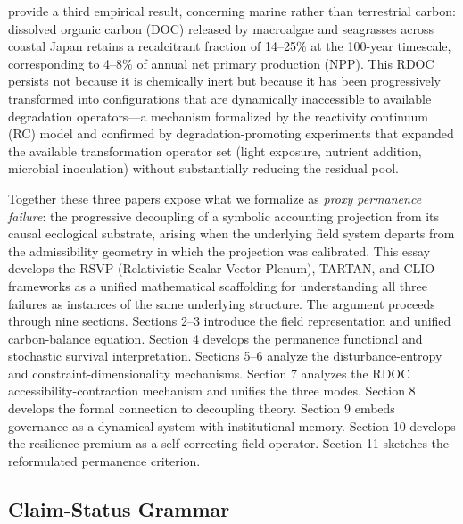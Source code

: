 \documentclass[12pt]{article}
\begin{document}
\citet{Watanabe2026} provide a third empirical result, concerning marine rather than
terrestrial carbon: dissolved organic carbon (DOC) released by macroalgae and seagrasses
across coastal Japan retains a recalcitrant fraction of 14--25\% at the 100-year timescale,
corresponding to 4--8\% of annual net primary production (NPP). This RDOC persists not
because it is chemically inert but because it has been progressively transformed into
configurations that are dynamically inaccessible to available degradation operators---a
mechanism formalized by the reactivity continuum (RC) model and confirmed by
degradation-promoting experiments that expanded the available transformation operator set
(light exposure, nutrient addition, microbial inoculation) without substantially reducing
the residual pool.

Together these three papers expose what we formalize as \emph{proxy permanence failure}:
the progressive decoupling of a symbolic accounting projection from its causal ecological
substrate, arising when the underlying field system departs from the admissibility geometry
in which the projection was calibrated. This essay develops the RSVP (Relativistic
Scalar-Vector Plenum), TARTAN, and CLIO frameworks as a unified mathematical scaffolding
for understanding all three failures as instances of the same underlying structure. The
argument proceeds through nine sections. Sections 2--3 introduce the field representation
and unified carbon-balance equation. Section 4 develops the permanence functional and
stochastic survival interpretation. Sections 5--6 analyze the disturbance-entropy and
constraint-dimensionality mechanisms. Section 7 analyzes the RDOC accessibility-contraction
mechanism and unifies the three modes. Section 8 develops the formal connection to
decoupling theory. Section 9 embeds governance as a dynamical system with institutional
memory. Section 10 develops the resilience premium as a self-correcting field operator.
Section 11 sketches the reformulated permanence criterion.

\subsection*{Claim-Status Grammar}
\end{document}
